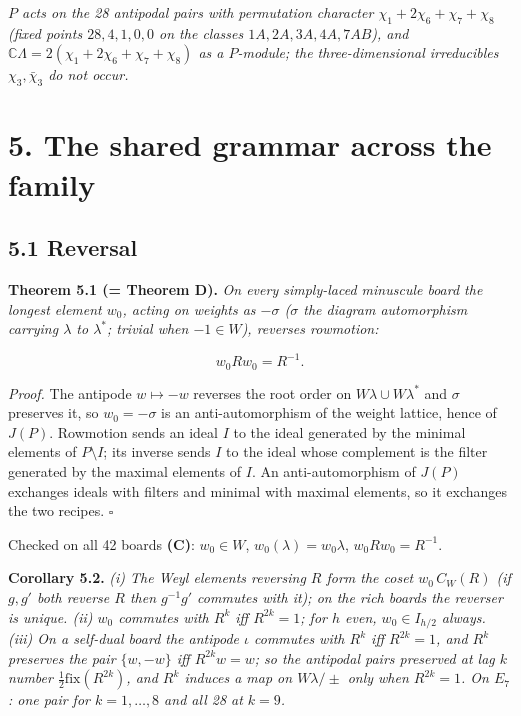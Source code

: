 \documentclass[
]{article}
\begin{document}
\emph{\(P\) acts on the 28 antipodal pairs with permutation character
\(\chi_1 + 2\chi_6 + \chi_7 + \chi_8\) (fixed points \(28, 4, 1, 0, 0\)
on the classes \(1A, 2A, 3A, 4A, 7AB\)), and
\(\mathbb{C}\Lambda = 2(\chi_1 + 2\chi_6 + \chi_7 + \chi_8)\) as a
\(P\)-module; the three-dimensional irreducibles \(\chi_3, \bar\chi_3\)
do not occur.}

\section{5. The shared grammar across the
family}\label{the-shared-grammar-across-the-family}

\subsection{5.1 Reversal}\label{reversal}

\textbf{Theorem 5.1 (= Theorem D).} \emph{On every simply-laced
minuscule board the longest element \(w_0\), acting on weights as
\(-\sigma\) (\(\sigma\) the diagram automorphism carrying \(\lambda\) to
\(\lambda^*\); trivial when \(-1 \in W\)), reverses rowmotion:}

\[w_0 R w_0 = R^{-1} .\]

\emph{Proof.} The antipode \(w \mapsto -w\) reverses the root order on
\(W\lambda \cup W\lambda^*\) and \(\sigma\) preserves it, so
\(w_0 = -\sigma\) is an anti-automorphism of the weight lattice, hence
of \(J(P)\). Rowmotion sends an ideal \(I\) to the ideal generated by
the minimal elements of \(P \setminus I\); its inverse sends \(I\) to
the ideal whose complement is the filter generated by the maximal
elements of \(I\). An anti-automorphism of \(J(P)\) exchanges ideals
with filters and minimal with maximal elements, so it exchanges the two
recipes. \(\square\)

Checked on all 42 boards \textbf{(C)}: \(w_0 \in W\),
\(w_0(\lambda) = w_0\lambda\), \(w_0Rw_0 = R^{-1}\).

\textbf{Corollary 5.2.} \emph{(i) The Weyl elements reversing \(R\) form
the coset \(w_0\,C_W(R)\) (if \(g, g'\) both reverse \(R\) then
\(g^{-1}g'\) commutes with it); on the rich boards the reverser is
unique. (ii) \(w_0\) commutes with \(R^k\) iff \(R^{2k} = 1\); for \(h\)
even, \(w_0 \in I_{h/2}\) always. (iii) On a self-dual board the
antipode \(\iota\) commutes with \(R^k\) iff \(R^{2k} = 1\), and \(R^k\)
preserves the pair \(\{w,-w\}\) iff \(R^{2k}w = w\); so the antipodal
pairs preserved at lag \(k\) number \(\tfrac12 \mathrm{fix}(R^{2k})\),
and \(R^k\) induces a map on \(W\lambda/\pm\) only when \(R^{2k} = 1\).
On \(E_7\): one pair for \(k = 1, \dots, 8\) and all 28 at \(k = 9\).}
\end{document}
